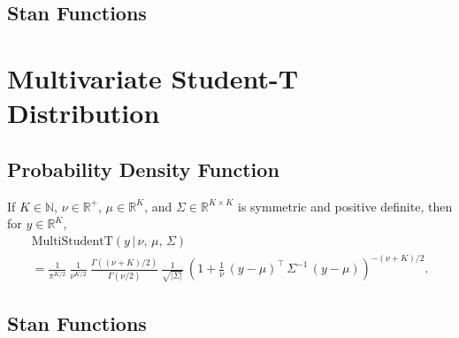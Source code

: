 \begin{description}
{\begin{description}


\subsection{Stan Functions}


\begin{description}  \end{description}


\section{Multivariate Student-T Distribution}


\subsection{Probability Density Function}


If $K \in \mathbb{N}$, $\nu \in \mathbb{R}^+$, $\mu \in \mathbb{R}^K$, and $\Sigma \in \mathbb{R}^{K \times K}$ is symmetric and positive definite, then for $y \in \mathbb{R}^K$, \[ \begin{array}{l} \text{MultiStudentT}(y\,|\,\nu,\,\mu,\,\Sigma) \\  = \frac{1}{\pi^{K/2}} \ \frac{1}{\nu^{K/2}} \ \frac{\Gamma\!\left((\nu + K)/2\right)}      {\Gamma(\nu/2)} \ \frac{1}{\sqrt{\left| \Sigma \right|}} \ \left( 1 + \frac{1}{\nu} \, \left(y - \mu\right)^{\top} \, \Sigma^{-1} \, \left(y - \mu\right) \right)^{-(\nu + K)/2} \! . \end{array} \]




\subsection{Stan Functions}



\end{description}}
\end{description}
